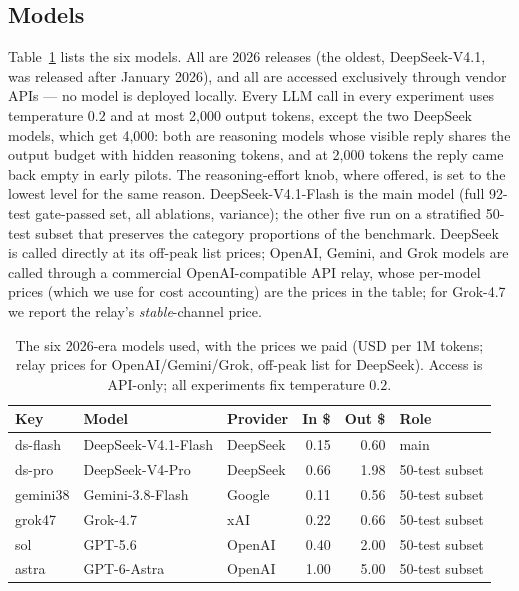\subsection{Models}

Table~\ref{tab:models} lists the six models. All are 2026 releases (the
oldest, DeepSeek-V4.1, was released after January 2026), and all are accessed
exclusively through vendor APIs — no model is deployed locally. Every LLM
call in every experiment uses temperature $0.2$ and at most 2{,}000 output
tokens, except the two DeepSeek models, which get 4{,}000: both are reasoning
models whose visible reply shares the output budget with hidden reasoning
tokens, and at 2{,}000 tokens the reply came back empty in early pilots. The
reasoning-effort knob, where offered, is set to the lowest level for the same
reason. DeepSeek-V4.1-Flash is the main model (full 92-test
gate-passed set, all ablations, variance); the other five run on a stratified 50-test
subset that preserves the category proportions of the benchmark. DeepSeek is
called directly at its off-peak list prices; OpenAI, Gemini, and Grok models
are called through a commercial OpenAI-compatible API relay, whose per-model
prices (which we use for cost accounting) are the prices in the table; for
Grok-4.7 we report the relay's \emph{stable}-channel price.

\begin{table}[t]
\caption{The six 2026-era models used, with the prices we paid (USD per 1M
tokens; relay prices for OpenAI/Gemini/Grok, off-peak list for DeepSeek).
Access is API-only; all experiments fix temperature $0.2$.}
\label{tab:models}
\small
\begin{tabular}{@{}lllrrl@{}}
\toprule
\textbf{Key} & \textbf{Model} & \textbf{Provider} & \textbf{In \$} &
\textbf{Out \$} & \textbf{Role}\\
\midrule
ds-flash & DeepSeek-V4.1-Flash & DeepSeek & 0.15 & 0.60 & main\\
ds-pro & DeepSeek-V4-Pro & DeepSeek & 0.66 & 1.98 & 50-test subset\\
gemini38 & Gemini-3.8-Flash & Google & 0.11 & 0.56 & 50-test subset\\
grok47 & Grok-4.7 & xAI & 0.22 & 0.66 & 50-test subset\\
sol & GPT-5.6 & OpenAI & 0.40 & 2.00 & 50-test subset\\
astra & GPT-6-Astra & OpenAI & 1.00 & 5.00 & 50-test subset\\
\bottomrule
\end{tabular}
\end{table}

